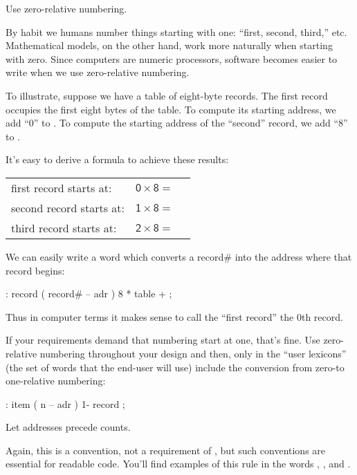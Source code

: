 \begin{tip}
Use zero-relative numbering.
\end{tip}
By habit we humans number things starting with one: ``first, second,
third,'' etc. Mathematical models, on the other hand, work more naturally
when starting with zero. Since computers are numeric processors, software
becomes easier to write when we use zero-relative numbering.

To illustrate, suppose we have a table of eight-byte records. The first
record occupies the first eight bytes of the table. To compute its
starting address, we add ``0'' to . To compute the starting
address of the ``second'' record, we add ``8'' to .


\medbreak
It's easy to derive a formula to achieve these results:

\bigskip
\begin{tabular}{@{}l@{ }l@{}r}
\sf first record starts at:  &  $\mathsf{0 \times 8} = {}$ & \sf 0  \\
\sf second record starts at: &  $\mathsf{1 \times 8} = {}$ & \sf 8  \\
\sf third record starts at:  &  $\mathsf{2 \times 8} = {}$ & \sf 16 \\
\end{tabular}
\bigskip

\noindent
We can easily write a word which converts a record\# into the address
where that record begins:

\begin{Code}
: record  ( record# -- adr )
   8 *  table + ;
\end{Code}
Thus in computer terms it makes sense to call the ``first record'' the 0th
record.

If your requirements demand that numbering start at one, that's
fine. Use zero-relative numbering throughout your design and then, only
in the ``user lexicons'' (the set of words that the end-user will use)
include the conversion from zero-to one-relative numbering:
\begin{Code}
: item  ( n -- adr )  1- record ;
\end{Code}

\begin{tip}
Let addresses precede counts.
\end{tip}
Again, this is a convention, not a requirement of \Forth{}, but such
conventions are essential for readable code. You'll find examples of this
rule in the words , , and .

